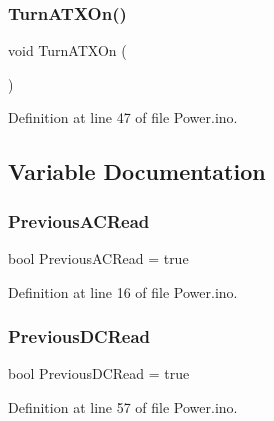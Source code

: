 \subsubsection{\texorpdfstring{TurnATXOn()}{TurnATXOn()}}
{\footnotesize\ttfamily void Turn\+A\+T\+X\+On (\begin{DoxyParamCaption}{ }\end{DoxyParamCaption})}



Definition at line 47 of file Power.\+ino.



\subsection{Variable Documentation}
\mbox{\label{_power_8ino_a0708082474eb2305081375bd7157dcf8}} 
\subsubsection{\texorpdfstring{PreviousACRead}{PreviousACRead}}
{\footnotesize\ttfamily bool Previous\+A\+C\+Read = true}



Definition at line 16 of file Power.\+ino.

\mbox{\label{_power_8ino_ae8027d359126c483a6bdc7aa0de85264}} 
\subsubsection{\texorpdfstring{PreviousDCRead}{PreviousDCRead}}
{\footnotesize\ttfamily bool Previous\+D\+C\+Read = true}



Definition at line 57 of file Power.\+ino.

